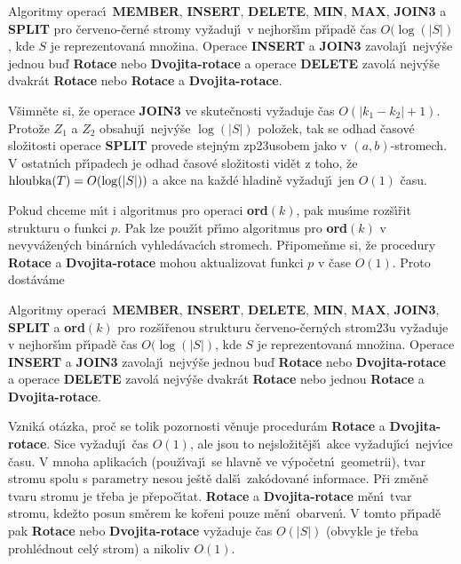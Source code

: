 Algoritmy operac\'\i\ {\bf MEMBER}, {\bf INSERT}, 
{\bf DE\-LE\-TE}, {\bf MIN}, {\bf MAX}, {\bf JOIN3} a {\bf SPLIT} pro \v cerveno-\v cern\'e 
stro\-my vy\v zaduj\'\i\ v nejhor\v s\'\i m p\v r\'\i pad\v e \v cas $O
(\log(|S|)$, kde $S$ je 
reprezentovan\'a mno\v zina.  Operace {\bf INSERT} a {\bf JOIN3} zavolaj\'\i\ 
nejv\'y\v se jednou bu\v d {\bf Rotace} nebo {\bf Dvojita-rota\-ce} a operace 
{\bf DE\-LE\-TE} zavol\'a nejv\'y\v se dvakr\'at {\bf Rotace} nebo {\bf Rotace} a 
{\bf Dvojita-ro\-ta\-ce}.  
\endproclaim

\flushpar V\v simn\v ete si, \v ze operace {\bf JOIN3} ve skute\v cnosti 
vy\v zaduje \v cas $O(|k_1-k_2|+1)$. Proto\v ze $Z_1$ a $Z_2$ obsahuj\'\i\ nejv\'y\v se 
$\log(|S|)$ polo\v zek, tak se odhad \v casov\'e slo\v zitosti operace {\bf SPLIT }
prove\-de stejn\'ym zp\accent23usobem jako v $(a,b)$-stromech. 
V ostatn\'\i ch p\v r\'\i\-pa\-dech je odhad \v casov\'e slo\v zitosti vid\v et z toho, 
\v ze $\operatorname{hloubka}(T)=O(\log(|S|))$ a akce na ka\v zd\'e hladin\v e vy\v zaduj\'\i\ jen 
$O(1)$ \v casu.
\medskip

\flushpar Pokud chceme m\'\i t i algoritmus pro operaci {\bf ord$
(k)$}, pak 
mus\'\i me roz\v s\'\i\v rit strukturu o funkci $p$. Pak lze pou\v z\'\i t p\v r\'\i mo 
algoritmus pro {\bf ord$(k)$} v nevyv\'a\v zen\'ych bin\'arn\'\i ch vyhled\'avac\'\i ch 
stromech. P\v ripome\v nme si, \v ze procedury {\bf Rotace} a {\bf Dvojita-rotace }
mohou aktualizovat funkci $p$ v \v case $O(1)$. Proto dost\'av\'ame 

Algoritmy operac\'\i\ {\bf MEMBER}, 
{\bf INSERT}, {\bf DE\-LE\-TE}, {\bf MIN}, {\bf MAX}, {\bf JOIN3}, {\bf SPLIT} a {\bf ord$
(k)$} pro 
roz\-\v s\'\i\-\v re\-nou strukturu \v cerveno-\v cern\'ych strom\accent23u vy\v zaduje 
v nejhor\v s\'\i m p\v r\'\i pad\v e \v cas $O(\log(|S|)$, kde $S$ je reprezentovan\'a 
mno\v zina.  Operace {\bf INSERT} a {\bf JOIN3} zavolaj\'\i\ nejv\'y\v se jednou bu\v d 
{\bf Rotace} nebo {\bf Dvojita-rota\-ce} a operace {\bf DELETE} zavol\'a nejv\'y\v se 
dvakr\'at {\bf Rotace} nebo jednou {\bf Rotace} a {\bf Dvojita-rotace}.  \endproclaim


\flushpar Vznik\'a ot\'azka, pro\v c se tolik pozornosti v\v enuje 
procedur\'am {\bf Rotace} a {\bf Dvojita-rotace}. Sice vy\v zaduj\'\i\ \v cas 
$O(1)$, ale jsou to nej\-slo\v zit\v ej\v s\'\i\ akce vy\v zaduj\'\i c\'\i\ nejv\'\i ce \v casu. 
V mnoha aplikac\'\i ch (pou\-\v z\'\i vaj\'\i\ se hlavn\v e ve v\'ypo\v cetn\'\i\ geometrii), 
tvar stromu spolu s parametry nesou je\v st\v e 
dal\v s\'\i\ zak\'odovan\'e informace. P\v ri zm\v en\v e tvaru stromu je 
t\v reba je p\v repo\v c\'\i tat. {\bf Rotace} a {\bf Dvojita-rotace} m\v en\'\i\ tvar 
stromu, kde\v zto posun sm\v erem ke ko\v reni pouze m\v en\'\i\ 
obarven\'\i . V tomto p\v r\'\i pad\v e pak {\bf Rotace} nebo {\bf Dvo\-ji\-ta-rotace }
vy\v zaduje \v cas $O(|S|)$ (obvykle je t\v reba prohl\'ednout cel\'y 
strom) a nikoliv $O(1)$.
\medskip

